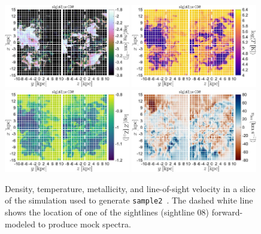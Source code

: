 \documentclass[fleqn,usenatbib]{mnras}
\begin{document}
\begin{figure}
    \centering
    \includegraphics[width=0.49\textwidth]{figures/sample2/projections/density_projection_maps_SL_08.jpg}
    \includegraphics[width=0.49\textwidth]{figures/sample2/projections/temperature_projection_maps_SL_08.jpg} \\
    \includegraphics[width=0.49\textwidth]{figures/sample2/projections/metallicity_projection_maps_SL_08.jpg}
    \includegraphics[width=0.49\textwidth]{figures/sample2/projections/velocity_projection_maps_SL_08.jpg}
    \caption{
    Density, temperature, metallicity, and line-of-sight velocity in a slice of the simulation used to generate \texttt{sample2}~\citep{mandelker2020Instability}.
    The dashed white line shows the location of one of the sightlines (sightline 08) forward-modeled to produce mock spectra.
    }
    \label{f: sample2 ray 08}
\end{figure}
\end{document}
